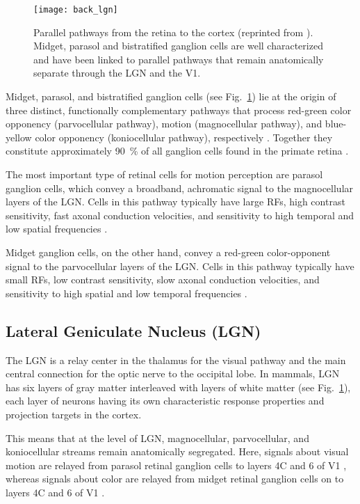 \begin{figure}[t]
  \centering
  \texttt{[image: back\_lgn]}
  \caption{
  Parallel pathways from the retina to the cortex
  (reprinted from \cite{NassiCallaway2009}).
  Midget, parasol and bistratified ganglion cells are well characterized 
  and have been linked to parallel pathways that remain anatomically separate
  through the \acf{LGN} and the \acf{V1}.}
  \label{fig:BKG|retinaLGNV1}
\end{figure}

Midget, parasol, and bistratified ganglion cells
(see Fig.~\ref{fig:BKG|retinaLGNV1})
lie at the origin of three distinct, 
functionally complementary pathways that process 
red-green color opponency (parvocellular pathway),
motion (magnocellular pathway),
and blue-yellow color opponency (koniocellular pathway), respectively
\citep{NassiCallaway2009}.
Together they constitute approximately \SI{90}{\percent} of all 
ganglion cells found in the primate retina
\citep{Dacey2000,Dacey2004}.

The most important type of retinal cells for motion perception are
parasol ganglion cells, which convey a broadband, achromatic signal
to the magnocellular layers of the \ac{LGN}.
Cells in this pathway typically have large \acp{RF}, high contrast
sensitivity, fast axonal conduction velocities, and sensitivity to
high temporal and low spatial frequencies \citep{Dacey2000,NassiCallaway2009}.

Midget ganglion cells, on the other hand,
convey a red-green color-opponent signal to the
parvocellular layers of the \ac{LGN}.
Cells in this pathway typically have small \acp{RF}, low contrast
sensitivity, slow axonal conduction velocities, and sensitivity to
high spatial and low temporal frequencies \citep{NassiCallaway2009}.


\subsection{Lateral Geniculate Nucleus (LGN)}
\label{sec:BKG|LGN}

The \acf{LGN} is a relay center in the thalamus for the visual pathway
and the main central connection for the optic nerve to the occipital lobe.
In mammals, \ac{LGN} has six layers of gray matter interleaved with
layers of white matter (see Fig.~\ref{fig:BKG|retinaLGNV1}),
each layer of neurons having its own characteristic response properties
and projection targets in the cortex.

This means that at the level of \ac{LGN}, 
magnocellular, parvocellular, and koniocellular streams 
remain anatomically segregated.
Here, signals about visual motion are relayed from parasol
retinal ganglion cells to layers 4C\textalpha{}  and 6 of \ac{V1} 
\citep{BlasdelLund1983,ChatterjeeCallaway2003},
whereas signals about color are relayed from midget retinal ganglion cells
on to layers 4C\textbeta{} and $6$ of \ac{V1} 
\citep{Dacey2000,BlasdelLund1983,ChatterjeeCallaway2003}.


